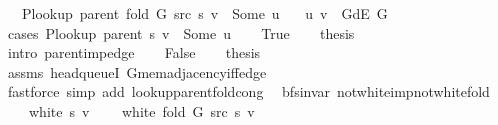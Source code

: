\begin{isabellebody}
\ \ \ {\isachardoublequoteopen}P{\isacharunderscore}{\kern0pt}lookup\ {\isacharparenleft}{\kern0pt}parent\ {\isacharparenleft}{\kern0pt}fold\ G\ src\ s{\isacharparenright}{\kern0pt}{\isacharparenright}{\kern0pt}\ v\ {\isacharequal}{\kern0pt}\ Some\ u{\isachardoublequoteclose}\isanewline
\ \ \ {\isachardoublequoteopen}{\isacharparenleft}{\kern0pt}u{\isacharcomma}{\kern0pt}\ v{\isacharparenright}{\kern0pt}\ {\isasymin}\ G{\isachardot}{\kern0pt}dE\ G{\isachardoublequoteclose}\isanewline
%
\isadelimproof
%
\endisadelimproof
%
\isatagproof
{}\isamarkupfalse%
\ {\isacharparenleft}{\kern0pt}cases\ {\isachardoublequoteopen}P{\isacharunderscore}{\kern0pt}lookup\ {\isacharparenleft}{\kern0pt}parent\ s{\isacharparenright}{\kern0pt}\ v\ {\isacharequal}{\kern0pt}\ Some\ u{\isachardoublequoteclose}{\isacharparenright}{\kern0pt}\isanewline
\ \ \isamarkupfalse%
\ True\isanewline
\ \ \isamarkupfalse%
\ {\isacharquery}{\kern0pt}thesis\isanewline
\ \ \ \ \isamarkupfalse%
\ {\isacharparenleft}{\kern0pt}intro\ parent{\isacharunderscore}{\kern0pt}imp{\isacharunderscore}{\kern0pt}edge{\isacharparenright}{\kern0pt}\isanewline
{}\isamarkupfalse%
\isanewline
\ \ \isamarkupfalse%
\ False\isanewline
\ \ \isamarkupfalse%
\ {\isacharquery}{\kern0pt}thesis\isanewline
\ \ \ \ \isamarkupfalse%
\ assms\ head{\isacharunderscore}{\kern0pt}queueI\ G{\isachardot}{\kern0pt}mem{\isacharunderscore}{\kern0pt}adjacency{\isacharunderscore}{\kern0pt}iff{\isacharunderscore}{\kern0pt}edge\isanewline
\ \ \ \ \isamarkupfalse%
\ {\isacharparenleft}{\kern0pt}fastforce\ simp\ add{\isacharcolon}{\kern0pt}\ lookup{\isacharunderscore}{\kern0pt}parent{\isacharunderscore}{\kern0pt}fold{\isacharunderscore}{\kern0pt}cong{\isacharparenright}{\kern0pt}\isanewline
{}\isamarkupfalse%
%
\endisatagproof
{\isafoldproof}%
%
\isadelimproof
\isanewline
%
\endisadelimproof
%
\isadeliminvisible
\isanewline
%
\endisadeliminvisible
%
\isataginvisible
{}\isamarkupfalse%
\ {\isacharparenleft}{\kern0pt}\ bfs{\isacharunderscore}{\kern0pt}invar{\isacharparenright}{\kern0pt}\ not{\isacharunderscore}{\kern0pt}white{\isacharunderscore}{\kern0pt}imp{\isacharunderscore}{\kern0pt}not{\isacharunderscore}{\kern0pt}white{\isacharunderscore}{\kern0pt}fold{\isacharcolon}{\kern0pt}\isanewline
\ \ \ {\isachardoublequoteopen}{\isasymnot}\ white\ s\ v{\isachardoublequoteclose}\isanewline
\ \ \ {\isachardoublequoteopen}{\isasymnot}\ white\ {\isacharparenleft}{\kern0pt}fold\ G\ src\ s{\isacharparenright}{\kern0pt}\ v{\isachardoublequoteclose}%

\end{isabellebody}
